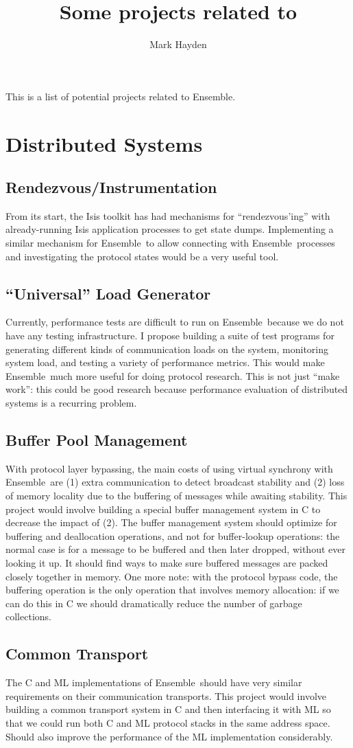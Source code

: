 \documentclass{article}
\title{Some projects related to \ensemble}
\author{Mark Hayden}
\newcommand {\ensemble}[0]	{Ensemble}
\newcommand {\project}[1]	{\subsection{#1}}
\begin{document}
\maketitle
This is a list of potential projects related to \ensemble.

\section{Distributed Systems}

\project{Rendezvous/Instrumentation} 
From its start, the Isis toolkit has had mechanisms for ``rendezvous'ing''
with already-running Isis application processes to get state dumps.
Implementing a similar mechanism for \ensemble\ to allow connecting with
\ensemble\ processes and investigating the protocol states would be a very
useful tool.

\project{``Universal'' Load Generator}
Currently, performance tests are difficult to run on \ensemble\ because we
do not have any testing infrastructure.  I propose building a suite of test
programs for generating different kinds of communication loads on the
system, monitoring system load, and testing a variety of performance
metrics.  This would make \ensemble\ much more useful for doing protocol
research.  This is not just ``make work'': this could be good research
because performance evaluation of distributed systems is a recurring
problem.

\project{Buffer Pool Management} 
With protocol layer bypassing, the main costs of using virtual synchrony
with \ensemble\ are (1) extra communication to detect broadcast stability and
(2) loss of memory locality due to the buffering of messages while awaiting
stability.  This project would involve building a special buffer management
system in C to decrease the impact of (2).  The buffer management system
should optimize for buffering and deallocation operations, and not for
buffer-lookup operations: the normal case is for a message to be buffered
and then later dropped, without ever looking it up.  It should find ways to
make sure buffered messages are packed closely together in memory.  One
more note: with the protocol bypass code, the buffering operation is the
only operation that involves memory allocation: if we can do this in C we
should dramatically reduce the number of garbage collections.

\project{Common Transport}
The C and ML implementations of \ensemble\ should have very similar requirements
on their communication transports.  This project would involve building a
common transport system in C and then interfacing it with ML so that we
could run both C and ML protocol stacks in the same address space.  Should
also improve the performance of the ML implementation considerably.
\end{document}
